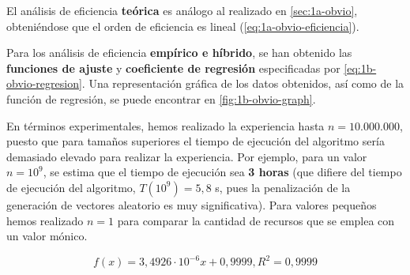 
El análisis de eficiencia \textbf{teórica} es análogo al realizado en \ref{sec:1a-obvio}, obteniéndose 
que el orden de eficiencia es lineal (\ref{eq:1a-obvio-eficiencia}). 

Para los análisis de eficiencia \textbf{empírico e híbrido}, se han obtenido las \textbf{funciones de ajuste}
y \textbf{coeficiente de regresión} especificadas por \ref{eq:1b-obvio-regresion}. Una representación
gráfica de los datos obtenidos, así como de la función de regresión, se puede encontrar en \ref{fig:1b-obvio-graph}. 

En términos experimentales, hemos realizado la experiencia hasta $n=10.000.000$, puesto que para tamaños superiores
el tiempo de ejecución del algoritmo sería demasiado elevado para realizar la experiencia. Por ejemplo, para un valor
$n=10^9$, se estima que el tiempo de ejecución sea \textbf{3 horas} (que difiere del tiempo de ejecución del algoritmo,
$T(10^9) = 5,8$ s, pues la penalización de la generación de vectores aleatorio es muy significativa). 
Para valores pequeños hemos realizado $n=1$ para comparar la cantidad de recursos que se emplea con un valor mónico. 

\begin{equation}
    \boxed{f(x) = 3,4926 \cdot 10 ^{-6} x + 0,9999, R^2 = 0,9999}
    \label{eq:1b-obvio-regresion}
\end{equation}

